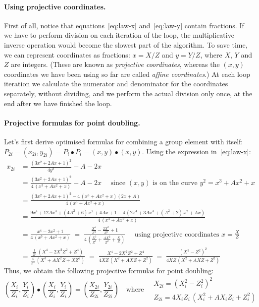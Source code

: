 \documentclass[manuscript]{acmart}
\begin{document}
\paragraph{Using projective coordinates.}

First of all, notice that equations~\eqref{eq:law-x} and~\eqref{eq:law-y} contain fractions.
If we have to perform division on each iteration of the loop, the multiplicative inverse operation would become the slowest part of the algorithm.
To save time, we can represent coordinates as fractions: $x = X/Z$ and $y = Y/Z$, where $X$, $Y$ and $Z$ are integers.
(These are known as \emph{projective coordinates}, whereas the $(x, y)$ coordinates we have been using so far are called \emph{affine coordinates}.)
At each loop iteration we calculate the numerator and denominator for the coordinates separately, without dividing, and we perform the actual division only once, at the end after we have finished the loop.

\paragraph{Projective formulas for point doubling.}

Let's first derive optimised formulas for combining a group element with itself:
$P_{2i} = (x_{2i}, y_{2i}) = P_i \bullet P_i = (x, y) \bullet (x, y)$.
Using the expression in~\eqref{eq:law-x}:
\begingroup\allowdisplaybreaks
\begin{align}
x_{2i} &= \frac{(3x^2 + 2Ax + 1)^2}{4y^2} - A - 2x \nonumber\\[5pt]
&= \frac{(3x^2 + 2Ax + 1)^2}{4\,(x^3 + Ax^2 + x)} - A - 2x 
    \quad\text{ since } (x, y) \text { is on the curve } y^2 = x^3 + Ax^2 + x \nonumber\\[5pt]
&= \frac{(3x^2 + 2Ax + 1)^2 - 4\,(x^3 + Ax^2 + x)(2x + A)}{4\,(x^3 + Ax^2 + x)} \nonumber\\[5pt]
&= \frac{9x^4 + 12Ax^3 + (4A^2 + 6)\,x^2 + 4Ax + 1 -4\,(2x^4 + 3Ax^3 + (A^2 + 2)\,x^2 + Ax)}{4\,(x^3 + Ax^2 + x)} \nonumber\\[5pt]
&= \frac{x^4 -2x^2 + 1}{4\,(x^3 + Ax^2 + x)} 
    \;=\; \frac{\frac{X^4}{Z^4} - \frac{2X^2}{Z^2} + 1}{4\,\left(\frac{X^3}{Z^3} + \frac{AX^2}{Z^2} + \frac{X}{Z}\right)}
    \quad\text{ using projective coordinates } x=\frac{X}{Z} \label{eq:alt-doubling}\\[5pt]
&= \frac{\frac{1}{Z^4}\,(X^4 - 2X^2 Z^2 + Z^4)}{\frac{4}{Z^3}\,(X^3 + AX^2 Z + X Z^2)}
    \;=\; \frac{X^4 - 2X^2 Z^2 + Z^4}{4XZ\,(X^2 + AX Z + Z^2)}
    \;=\; \frac{(X^2 - Z^2)^2}{4XZ\,(X^2 + AX Z + Z^2)} \nonumber
\end{align}
\endgroup
Thus, we obtain the following projective formulas for point doubling:
\begin{equation}
\left(\frac{X_i}{Z_i}, \frac{Y_i}{Z_i}\right) \bullet \left(\frac{X_i}{Z_i}, \frac{Y_i}{Z_i}\right) =
\left(\frac{X_{2i}}{Z_{2i}}, \frac{Y_{2i}}{Z_{2i}}\right) \quad\text{where}\quad
\begin{array}{l}
    X_{2i} = (X_i^2 - Z_i^2)^2 \\[5pt]
    Z_{2i} = 4X_i Z_i\,(X_i^2 + AX_i Z_i + Z_i^2)
\end{array}\label{eq:projective-double}
\end{equation}
\end{document}
